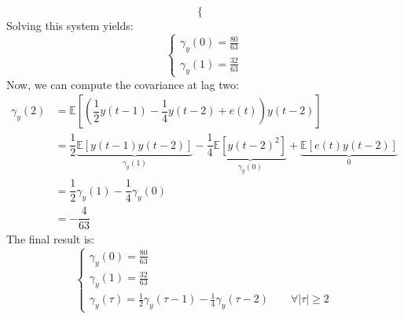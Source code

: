 \begin{enumerate}
\[\begin{cases}
        \end{cases}\]
        Solving this system yields:
        \[\begin{cases}
            \gamma_y(0)=\frac{80}{63} \\ 
            \gamma_y(1)=\frac{32}{63}
        \end{cases}\]
        Now, we can compute the covariance at lag two:
        \begin{align*}
            \gamma_y(2)     &= \mathbb{E}\left[\left(\dfrac{1}{2}y(t-1)-\dfrac{1}{4}y(t-2)+e(t)\right)y(t-2)\right] \\
                            &= \dfrac{1}{2}\underbrace{\mathbb{E}\left[y(t-1)y(t-2)\right]}_{\gamma_y(1)} -\dfrac{1}{4}\underbrace{\mathbb{E}\left[{y(t-2)}^2\right]}_{\gamma_y(0)} +\underbrace{\mathbb{E}\left[e(t)y(t-2)\right]}_0  \\
                            &= \dfrac{1}{2}\gamma_y(1) -\dfrac{1}{4}\gamma_y(0) \\
                            &= -\dfrac{4}{63}
        \end{align*}
        The final result is:
        \[\begin{cases}
            \gamma_y(0)=\frac{80}{63} \\
            \gamma_y(1)=\frac{32}{63} \\
            \gamma_y(\tau)=\frac{1}{2}\gamma_y(\tau-1)-\frac{1}{4}\gamma_y(\tau-2) \qquad \forall\left\lvert \tau\right\rvert \geq 2
        \end{cases}\]
\end{enumerate}